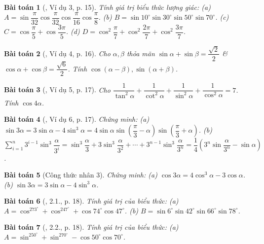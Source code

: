 \documentclass{article}
\newtheorem{baitoan}{Bài toán}
\begin{document}
\begin{baitoan}[\cite{Hung_nang_cao_phat_trien_Toan_11_tap_1}, Ví dụ 3, p. 15]
	Tính giá trị biểu thức lượng giác: (a) $A = \sin\dfrac{\pi}{32}\cos\dfrac{\pi}{32}\cos\dfrac{\pi}{16}\cos\dfrac{\pi}{8}$. (b) $B = \sin10^\circ\sin30^\circ\sin50^\circ\sin70^\circ$. (c) $C = \cos\dfrac{\pi}{5} + \cos\dfrac{3\pi}{5}$. (d) $D = \cos^2\dfrac{\pi}{7} + \cos^2\dfrac{2\pi}{7} + \cos^2\dfrac{3\pi}{7}$.
\end{baitoan}

\begin{baitoan}[\cite{Hung_nang_cao_phat_trien_Toan_11_tap_1}, Ví dụ 4, p. 16]
	Cho $\alpha,\beta$ thỏa mãn $\sin\alpha + \sin\beta = \dfrac{\sqrt{2}}{2}$ \& $\cos\alpha + \cos\beta = \dfrac{\sqrt{6}}{2}$. Tính $\cos(\alpha - \beta),\sin(\alpha + \beta)$.
\end{baitoan}

\begin{baitoan}[\cite{Hung_nang_cao_phat_trien_Toan_11_tap_1}, Ví dụ 5, p. 17]
	Cho $\dfrac{1}{\tan^2\alpha} + \dfrac{1}{\cot^2\alpha} + \dfrac{1}{\sin^2\alpha} + \dfrac{1}{\cos^2\alpha} = 7$. Tính $\cos4\alpha$.
\end{baitoan}

\begin{baitoan}[\cite{Hung_nang_cao_phat_trien_Toan_11_tap_1}, Ví dụ 6, p. 17]
	Chứng minh: (a) $\sin3\alpha = 3\sin\alpha - 4\sin^3\alpha = 4\sin\alpha\sin\left(\dfrac{\pi}{3} - \alpha\right)\sin\left(\dfrac{\pi}{3} + \alpha\right)$. (b) $\sum_{i=1}^n 3^{i-1}\sin^3\dfrac{\alpha}{3^i} = \sin^3\dfrac{\alpha}{3} + 3\sin^3\dfrac{\alpha}{3^2} + \cdots + 3^{n-1}\sin^3\dfrac{\alpha}{3^n} = \dfrac{1}{4}\left(3^n\sin\dfrac{\alpha}{3^n} - \sin\alpha\right)$.
\end{baitoan}

\begin{baitoan}[Công thức nhân 3]
	Chứng minh: (a) $\cos3\alpha = 4\cos^3\alpha - 3\cos\alpha$. (b) $\sin3\alpha = 3\sin\alpha - 4\sin^3\alpha$.
\end{baitoan}

\begin{baitoan}[\cite{Hung_nang_cao_phat_trien_Toan_11_tap_1}, 2.1., p. 18]
	Tính giá trị của biểu thức: (a) $A = \cos^273^\circ + \cos^247^\circ + \cos74^\circ\cos47^\circ$. (b) $B = \sin6^\circ\sin42^\circ\sin66^\circ\sin78^\circ$.
\end{baitoan}

\begin{baitoan}[\cite{Hung_nang_cao_phat_trien_Toan_11_tap_1}, 2.2., p. 18]
	Tính giá trị của biểu thức: (a) $A = \sin^250^\circ + \sin^270^\circ - \cos50^\circ\cos70^\circ$.
\end{baitoan}
\end{document}
